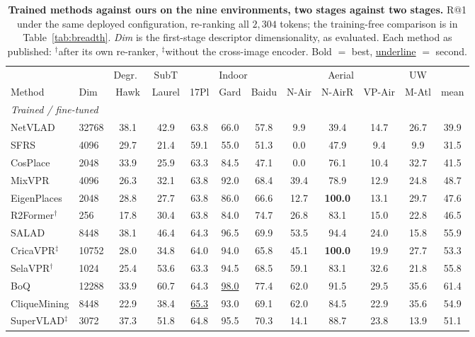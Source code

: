 \begin{table}[t]
\caption{\textbf{Trained methods against ours on the nine environments, two stages against two stages.} R@1 under the same deployed configuration, re-ranking all $2{,}304$ tokens; the training-free comparison is in Table~\ref{tab:breadth}. \emph{Dim} is the first-stage descriptor dimensionality, as evaluated. Each method as published: $^{\dagger}$after its own re-ranker, $^{\ddag}$without the cross-image encoder. Bold $=$ best, \underline{underline} $=$ second.}
\label{tab:ood}
\centering
{\scriptsize\setlength{\tabcolsep}{2pt}%
\begin{tabular}{llccccccccc|c}
\toprule
 & & Degr.\ & SubT & \multicolumn{3}{c}{Indoor} & \multicolumn{3}{c}{Aerial} & UW & \\
\cmidrule(lr){3-11}
Method & Dim & Hawk & Laurel & 17Pl & Gard & Baidu & N-Air & N-AirR & VP-Air & M-Atl & mean \\
\midrule
\multicolumn{12}{l}{\emph{Trained / fine-tuned}} \\NetVLAD & 32768 & 38.1 & 42.9 & 63.8 & 66.0 & 57.8 & 9.9 & 39.4 & 14.7 & 26.7 & 39.9 \\
SFRS & 4096 & 29.7 & 21.4 & 59.1 & 55.0 & 51.3 & 0.0 & 47.9 & 9.4 & 9.9 & 31.5 \\
CosPlace & 2048 & 33.9 & 25.9 & 63.3 & 84.5 & 47.1 & 0.0 & 76.1 & 10.4 & 32.7 & 41.5 \\
MixVPR & 4096 & 26.3 & 32.1 & 63.8 & 92.0 & 68.4 & 39.4 & 78.9 & 12.9 & 24.8 & 48.7 \\
EigenPlaces & 2048 & 28.8 & 27.7 & 63.8 & 86.0 & 66.6 & 12.7 & \textbf{100.0} & 13.1 & 29.7 & 47.6 \\
R2Former$^{\dagger}$ & 256 & 17.8 & 30.4 & 63.8 & 84.0 & 74.7 & 26.8 & 83.1 & 15.0 & 22.8 & 46.5 \\
SALAD & 8448 & 38.1 & 46.4 & 64.3 & 96.5 & 69.9 & 53.5 & 94.4 & 24.0 & 15.8 & 55.9 \\
CricaVPR$^\ddag$ & 10752 & 28.0 & 34.8 & 64.0 & 94.0 & 65.8 & 45.1 & \textbf{100.0} & 19.9 & 27.7 & 53.3 \\
SelaVPR$^{\dagger}$ & 1024 & 25.4 & 53.6 & 63.3 & 94.5 & 68.5 & 59.1 & 83.1 & 32.6 & 21.8 & 55.8 \\
BoQ & 12288 & 33.9 & 60.7 & 64.3 & \underline{98.0} & 77.4 & 62.0 & 91.5 & 29.5 & 35.6 & 61.4 \\
CliqueMining & 8448 & 22.9 & 38.4 & \underline{65.3} & 93.0 & 69.1 & 62.0 & 84.5 & 22.9 & 35.6 & 54.9 \\
SuperVLAD$^\ddag$ & 3072 & 37.3 & 51.8 & 64.8 & 95.5 & 70.3 & 14.1 & 88.7 & 23.8 & 13.9 & 51.1 \\

\end{tabular}}
\end{table}
